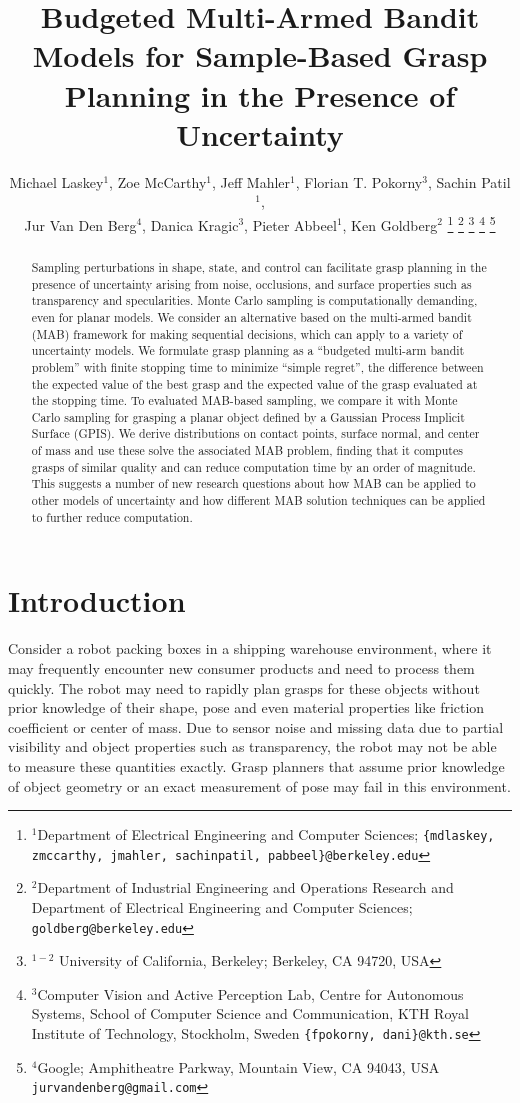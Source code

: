 \documentclass[letterpaper, 10 pt, conference]{ieeeconf}  %
\title{\LARGE \bf
Budgeted Multi-Armed Bandit Models for Sample-Based Grasp Planning in the Presence of Uncertainty}
\author{Michael Laskey$^1$, Zoe McCarthy$^1$, Jeff Mahler$^1$, Florian T. Pokorny$^3$, Sachin Patil$^1$,\\ Jur Van Den Berg$^4$,  Danica Kragic$^3$, Pieter Abbeel$^1$, Ken Goldberg$^2$%
\thanks{$^1$Department of Electrical Engineering and Computer Sciences; {\tt\small \{mdlaskey, zmccarthy, jmahler, sachinpatil, pabbeel\}@berkeley.edu}}%
\thanks{$^2$Department of Industrial Engineering and Operations Research and Department of Electrical Engineering and Computer Sciences; {\tt\small goldberg@berkeley.edu}}%
\thanks{$^{1-2}$ University of California, Berkeley;  Berkeley, CA 94720, USA}%
\thanks{$^3$Computer Vision and Active Perception Lab, Centre for Autonomous Systems, School of Computer Science and Communication, KTH Royal Institute of Technology, Stockholm, Sweden {\tt\small \{fpokorny, dani\}@kth.se}}%
\thanks{$^4$Google; Amphitheatre Parkway, Mountain View, CA 94043, USA {\tt\small jurvandenberg@gmail.com}}%
}
\begin{document}
\maketitle
\thispagestyle{empty}
\pagestyle{empty}




\begin{abstract}
Sampling perturbations in shape, state, and control can facilitate grasp planning in the presence of uncertainty arising from noise, occlusions, and surface properties such as transparency and specularities.  Monte Carlo sampling is computationally demanding, even for planar models. We consider an alternative based on the multi-armed bandit (MAB) framework for making sequential decisions, which can apply to a variety of uncertainty models.  We formulate grasp planning as a ``budgeted multi-arm bandit problem” with finite stopping time to minimize ``simple regret”, the difference between the expected value of the best grasp and the expected value of the grasp evaluated at the stopping time.  To evaluated MAB-based sampling, we compare it with Monte Carlo sampling for grasping a planar object defined by a Gaussian Process Implicit Surface (GPIS). We derive distributions on contact points, surface normal, and center of mass and use these solve the associated MAB problem, finding that it computes grasps of similar quality and can reduce computation time by an order of magnitude.  This suggests a number of new research questions about how MAB can be applied to other models of uncertainty and how different MAB solution techniques can be applied to further reduce computation.
\end{abstract}


\section{Introduction}



Consider a robot packing boxes in a shipping warehouse environment, where it may frequently encounter new consumer products and need to process them quickly.
The robot may need to rapidly plan grasps for these objects without prior knowledge of their shape, pose and even material properties like friction coefficient or center of mass.  Due to sensor noise and missing data due to partial visibility and object properties such as transparency, the robot may not be able to measure these quantities exactly.
Grasp planners that assume prior knowledge of object geometry or an exact measurement of pose may fail in this environment.
\end{document}
